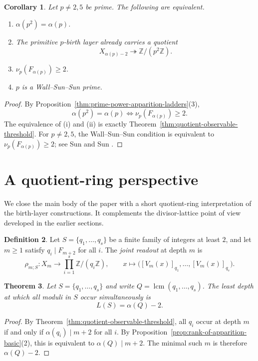 \documentclass[11pt,letterpaper]{article}
\numberwithin{equation}{section}
\theoremstyle{plain}
\newtheorem{theorem}{Theorem}[section]
\newtheorem{corollary}[theorem]{Corollary}
\theoremstyle{definition}
\newtheorem{definition}[theorem]{Definition}
\theoremstyle{remark}
\newcommand{\ZZ}{\mathbb{Z}}
\DeclareMathOperator{\lcmop}{lcm}
\begin{document}
\begin{corollary}
\label{cor:wss-thickening-criterion}
Let $p\neq 2,5$ be prime. The following are equivalent.
\begin{enumerate}[label=(\roman*)]
\item $\alpha(p^2)=\alpha(p)$.
\item The primitive $p$-birth layer already carries a quotient
\[
X_{\alpha(p)-2}\twoheadrightarrow \ZZ/(p^2\ZZ).
\]
\item $\nu_p(F_{\alpha(p)})\ge 2$.
\item $p$ is a Wall--Sun--Sun prime.
\end{enumerate}
\end{corollary}

\begin{proof}
By Proposition~\ref{thm:prime-power-apparition-ladders}(3),
\[
\alpha(p^2)=\alpha(p)
\iff
\nu_p(F_{\alpha(p)})\ge 2.
\]
The equivalence of (i) and (ii) is exactly
Theorem~\ref{thm:quotient-observable-threshold}. For $p\neq 2,5$, the
Wall--Sun--Sun condition is equivalent to $\nu_p(F_{\alpha(p)})\ge 2$; see
Sun and Sun \cite{SunSun1992FibonacciFLT}.
\end{proof}

\section{A quotient-ring perspective}

We close the main body of the paper with a short quotient-ring interpretation
of the birth-layer constructions. It complements the divisor-lattice point of
view developed in the earlier sections.

\begin{definition}
\label{def:joint-readout}
Let $S=\{q_1,\dots,q_s\}$ be a finite family of integers at least $2$, and let
$m\ge 1$ satisfy $q_i\mid F_{m+2}$ for all $i$. The \emph{joint readout} at
depth $m$ is
\[
\rho_{m;S}:X_m\longrightarrow \prod_{i=1}^s \ZZ/(q_i\ZZ),
\qquad
x\longmapsto \bigl([V_m(x)]_{q_1},\dots,[V_m(x)]_{q_s}\bigr).
\]
\end{definition}

\begin{theorem}
\label{thm:finite-signature-unified-resolution-minimal}
Let $S=\{q_1,\dots,q_s\}$ and write $Q=\lcmop(q_1,\dots,q_s)$. The least depth at
which all moduli in $S$ occur simultaneously is
\[
L(S)=\alpha(Q)-2.
\]
\end{theorem}

\begin{proof}
By Theorem~\ref{thm:quotient-observable-threshold}, all $q_i$ occur at depth
$m$ if and only if $\alpha(q_i)\mid m+2$ for all $i$. By
Proposition~\ref{prop:rank-of-apparition-basic}(2), this is equivalent to
$\alpha(Q)\mid m+2$. The minimal such $m$ is therefore $\alpha(Q)-2$.
\end{proof}
\end{document}

